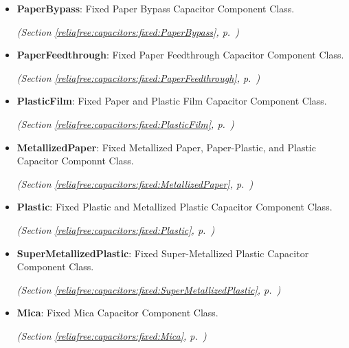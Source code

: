 \begin{itemize}  \setlength{\parskip}{0ex}
  \item \textbf{PaperBypass}: Fixed Paper Bypass Capacitor Component Class.



  \textit{(Section \ref{reliafree:capacitors:fixed:PaperBypass}, p.~\pageref{reliafree:capacitors:fixed:PaperBypass})}

  \item \textbf{PaperFeedthrough}: Fixed Paper Feedthrough Capacitor Component Class.



  \textit{(Section \ref{reliafree:capacitors:fixed:PaperFeedthrough}, p.~\pageref{reliafree:capacitors:fixed:PaperFeedthrough})}

  \item \textbf{PlasticFilm}: Fixed Paper and Plastic Film Capacitor Component Class.



  \textit{(Section \ref{reliafree:capacitors:fixed:PlasticFilm}, p.~\pageref{reliafree:capacitors:fixed:PlasticFilm})}

  \item \textbf{MetallizedPaper}: Fixed Metallized Paper, Paper-Plastic, and Plastic Capacitor Componnt 
Class.



  \textit{(Section \ref{reliafree:capacitors:fixed:MetallizedPaper}, p.~\pageref{reliafree:capacitors:fixed:MetallizedPaper})}

  \item \textbf{Plastic}: Fixed Plastic and Metallized Plastic Capacitor Component Class.



  \textit{(Section \ref{reliafree:capacitors:fixed:Plastic}, p.~\pageref{reliafree:capacitors:fixed:Plastic})}

  \item \textbf{SuperMetallizedPlastic}: Fixed Super-Metallized Plastic Capacitor Component Class.



  \textit{(Section \ref{reliafree:capacitors:fixed:SuperMetallizedPlastic}, p.~\pageref{reliafree:capacitors:fixed:SuperMetallizedPlastic})}

  \item \textbf{Mica}: Fixed Mica Capacitor Component Class.



  \textit{(Section \ref{reliafree:capacitors:fixed:Mica}, p.~\pageref{reliafree:capacitors:fixed:Mica})}


\end{itemize}

